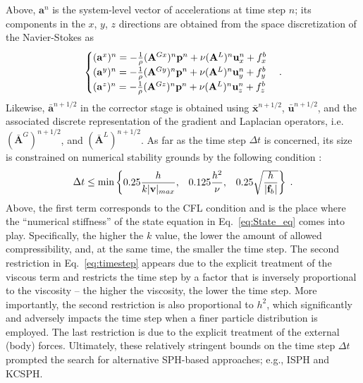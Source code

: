 Above, $\mathbf{a}^n$ is the system-level vector of accelerations at time step $n$; its components in the $x$, $y$, $z$ directions are obtained from the space discretization of the Navier-Stokes as   
\begin{align*}
\begin{cases}
(\mathbf{a}^x)^n=  -\frac{1}{\rho} (\mathbf{A}^{Gx})^n\mathbf{p}^n + \nu (\mathbf{A}^L)^n{\bf u}^n_x+{ f}_x^b\\
(\mathbf{a}^y)^n=  -\frac{1}{\rho} (\mathbf{A}^{Gy})^n\mathbf{p}^n + \nu (\mathbf{A}^L)^n{\bf u}^n_y+{ f}_y^b\\
(\mathbf{a}^z)^n=  -\frac{1}{\rho} (\mathbf{A}^{Gz})^n\mathbf{p}^n + \nu (\mathbf{A}^L)^n{\bf u}^n_z+{ f}_z^b
\end{cases} .
\end{align*}
Likewise, ${\bar{\mathbf{a}}}^{n+1/2}$ in the corrector stage is obtained using ${\bar{\mathbf{x}}}^{n+1/2}$, ${\bar{\mathbf{u}}}^{n+1/2}$, and the associated discrete representation of the gradient and Laplacian operators, i.e. $({\bar{\mathbf{A}}}^G)^{n+1/2}$, and $({\bar{\mathbf{A}}}^L)^{n+1/2}$. As far as the time step $\Delta t$ is concerned, its size is constrained on numerical stability grounds by the following condition \cite{liu2003smoothed}:
\begin{align}\label{eq:timestep}
\Delta t \leq \text{min} \begin{Bmatrix}
0.25 \dfrac{h}{k| {\bf v}|_{max}},& 0.125 \dfrac{h^2}{\nu}, & 0.25 \sqrt{\dfrac{h}{|\mathbf{f}_b|}}\end{Bmatrix} \; .
\end{align}
Above, the first term corresponds to the CFL condition and is the place where the ``numerical stiffness'' of the state equation in Eq.~\ref{eq:State_eq} comes into play. Specifically, the higher the $k$ value, the lower the amount of allowed compressibility, and, at the same time, the smaller the time step. The second restriction in Eq.~\ref{eq:timestep} appears due to the explicit treatment of the viscous term and restricts the time step by a factor that is inversely proportional to the viscosity -- the higher the viscosity, the lower the time step. More importantly, the second restriction is also proportional to $h^2$, which significantly and adversely impacts the time step when a finer particle distribution is employed. The last restriction is due to the explicit treatment of the external (body) forces. Ultimately, these relatively stringent bounds on the time step $\Delta t$ prompted the search for alternative SPH-based approaches; e.g., ISPH and KCSPH.


